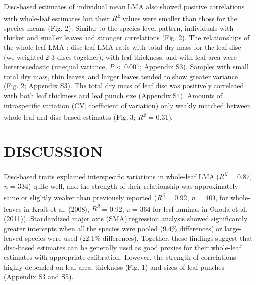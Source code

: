 \documentclass[
  12pt,
  a4paper,
,tablecaptionabove
]{scrartcl}
\begin{document}
Disc-based estimates of individual mean LMA also showed positive
correlations with whole-leaf estimates but their
\emph{R\textsuperscript{2}} values were smaller than those for the
species means (Fig. 2). Similar to the species-level pattern,
individuals with thicker and smaller leaves had stronger correlations
(Fig. 2). The relationships of the whole-leaf LMA : disc leaf LMA ratio
with total dry mass for the leaf disc (we weighted 2-3 discs together),
with leaf thickness, and with leaf area were heteroscedastic (unequal
variance, \emph{P} \textless{} 0.001; Appendix S3). Samples with small
total dry mass, thin leaves, and larger leaves tended to show greater
variance (Fig. 2; Appendix S3). The total dry mass of leaf disc was
positively correlated with both leaf thickness and leaf punch size
(Appendix S4). Amounts of intraspecific variation (CV; coefficient of
variation) only weakly matched between whole-leaf and disc-based
estimates (Fig. 3; \emph{R\textsuperscript{2}} = 0.31).

\hypertarget{discussion}{%
\section{DISCUSSION}\label{discussion}}

Disc-based traits explained interspecific variations in whole-leaf LMA
(\emph{R\textsuperscript{2}} = 0.87, \emph{n} = 334) quite well, and the
strength of their relationship was approximately same or slightly weaker
than previously reported (\emph{R\textsuperscript{2}} = 0.92, \emph{n} =
409, for whole-leaves in Kraft et al.
(\protect\hyperlink{ref-Kraft2008}{2008}), \emph{R\textsuperscript{2}} =
0.92, \emph{n} = 364 for leaf laminas in Onoda et al.
(\protect\hyperlink{ref-Onoda2011}{2011})). Standardized major axis
(SMA) regression analysis showed significantly greater intercepts when
all the species were pooled (9.4\% differences) or large-leaved species
were used (22.1\% differences). Together, these findings suggest that
disc-based estimates can be generally used as good proxies for their
whole-leaf estimates with appropriate calibration. However, the strength
of correlations highly depended on leaf area, thickness (Fig. 1) and
sizes of leaf punches (Appendix S3 and S5).
\end{document}

